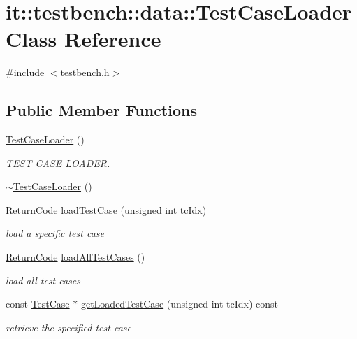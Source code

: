 \hypertarget{classit_1_1testbench_1_1data_1_1TestCaseLoader}{\section{it\-:\-:testbench\-:\-:data\-:\-:Test\-Case\-Loader Class Reference}
\label{df/dca/classit_1_1testbench_1_1data_1_1TestCaseLoader}
}


{\ttfamily \#include $<$testbench.\-h$>$}

\subsection*{Public Member Functions}
\begin{DoxyCompactItemize}
\item 
\hyperlink{classit_1_1testbench_1_1data_1_1TestCaseLoader_afb65e8aa61521db9d2a407ecbe16f2b9}{Test\-Case\-Loader} ()
\begin{DoxyCompactList}\small\item\em T\-E\-S\-T C\-A\-S\-E L\-O\-A\-D\-E\-R. \end{DoxyCompactList}\item 
\hyperlink{classit_1_1testbench_1_1data_1_1TestCaseLoader_a99c6d95131bb546da169da24888970e1}{$\sim$\-Test\-Case\-Loader} ()
\item 
\hyperlink{structit_1_1testbench_1_1data_1_1ReturnCode}{Return\-Code} \hyperlink{classit_1_1testbench_1_1data_1_1TestCaseLoader_ae9f65c0d517961afc1165b77dc5fed94}{load\-Test\-Case} (unsigned int tc\-Idx)
\begin{DoxyCompactList}\small\item\em load a specific test case \end{DoxyCompactList}\item 
\hyperlink{structit_1_1testbench_1_1data_1_1ReturnCode}{Return\-Code} \hyperlink{classit_1_1testbench_1_1data_1_1TestCaseLoader_aae15e2881f2ae15dcb5ecc95d55849b4}{load\-All\-Test\-Cases} ()
\begin{DoxyCompactList}\small\item\em load all test cases \end{DoxyCompactList}\item 
const \hyperlink{classit_1_1testbench_1_1data_1_1TestCase}{Test\-Case} $\ast$ \hyperlink{classit_1_1testbench_1_1data_1_1TestCaseLoader_a7ac7a2883fc87c48fb5038b19e4850ec}{get\-Loaded\-Test\-Case} (unsigned int tc\-Idx) const 
\begin{DoxyCompactList}\small\item\em retrieve the specified test case \end{DoxyCompactList}\item 

\end{DoxyCompactItemize}
